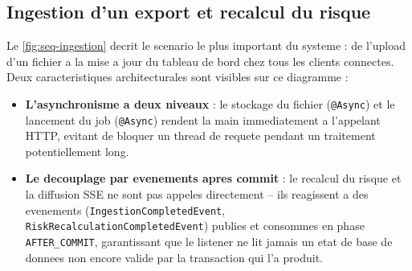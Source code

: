 \subsection{Ingestion d'un export et recalcul du risque}

Le \cref{fig:seq-ingestion} decrit le scenario le plus important du systeme : de
l'upload d'un fichier a la mise a jour du tableau de bord chez tous les clients
connectes. Deux caracteristiques architecturales sont visibles sur ce diagramme :

\begin{itemize}
  \item \textbf{L'asynchronisme a deux niveaux} : le stockage du fichier
  (\texttt{@Async}) et le lancement du job (\texttt{@Async}) rendent la main
  immediatement a l'appelant HTTP, evitant de bloquer un thread de requete pendant
  un traitement potentiellement long.
  \item \textbf{Le decouplage par evenements apres commit} : le recalcul du risque et
  la diffusion SSE ne sont pas appeles directement -- ils reagissent a des
  evenements (\texttt{IngestionCompletedEvent},
  \texttt{RiskRecalculationCompletedEvent}) publies et consommes en phase
  \texttt{AFTER\_COMMIT}, garantissant que le listener ne lit jamais un etat de base
  de donnees non encore valide par la transaction qui l'a produit.
\end{itemize}

